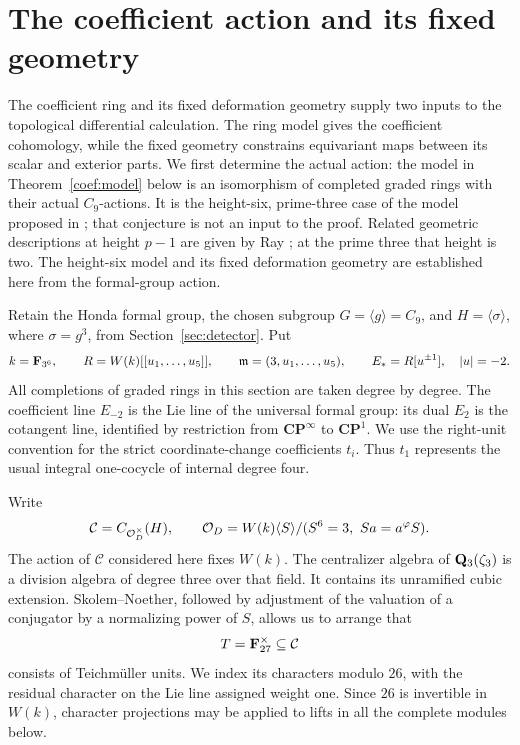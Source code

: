 \section{The coefficient action and its fixed geometry}
\label{sec:coefficients}

The coefficient ring and its fixed deformation geometry supply two
inputs to the topological differential calculation.  The ring model
gives the coefficient cohomology, while the fixed geometry constrains
equivariant maps between its scalar and exterior parts.
We first determine the actual action: the model in
Theorem~\ref{coef:model} below is an isomorphism of completed graded rings
with their actual \(C_9\)-actions.  It is the height-six, prime-three case
of the model proposed in \cite[Conjecture~0.3]{BR}; that conjecture is not
an input to the proof.
Related geometric descriptions at height \(p-1\) are given by
Ray \cite[Theorem~C and Section~10.5]{Ray}; at the prime three
that height is two.  The height-six model and its fixed deformation
geometry are established here from the formal-group action.

Retain the Honda formal group, the chosen subgroup
\(G=\langle g\rangle=C_9\), and \(H=\langle\sigma\rangle\), where
\(\sigma=g^3\), from Section~\ref{sec:detector}.  Put
\[
 k=\mathbf F_{3^6},\qquad
 R=W(k)[[u_1,\ldots,u_5]],\qquad
 \mathfrak m=(3,u_1,\ldots,u_5),\qquad E_*=R[u^{\pm1}],
 \quad |u|=-2.
\]
All completions of graded rings in this section are taken degree by
degree.  The coefficient line \(E_{-2}\) is the Lie line of the universal
formal group: its dual \(E_2\) is the cotangent line, identified by
restriction from \(\mathbf{CP}^{\infty}\) to \(\mathbf{CP}^1\).
We use the right-unit convention for the strict coordinate-change
coefficients \(t_i\).  Thus \(t_1\) represents the usual integral
one-cocycle of internal degree four.

Write
\[
 \mathcal C=C_{\mathcal O_D^\times}(H),\qquad
 \mathcal O_D=W(k)\langle S\rangle/(S^6=3,\ Sa=a^\varphi S).
\]
The action of \(\mathcal C\) considered here fixes \(W(k)\).  The
centralizer algebra of \(\mathbf Q_3(\zeta_3)\) is a division algebra of degree
three over that field.  It contains its unramified cubic extension.
Skolem--Noether, followed by adjustment of the valuation of a conjugator
by a normalizing power of \(S\), allows us to arrange that
\[
 T=\mathbf F_{27}^{\times}\subseteq\mathcal C
\]
consists of Teichm\"uller units.  We index its characters modulo \(26\),
with the residual character on the Lie line assigned weight one.
Since \(26\) is invertible in \(W(k)\), character projections may be
applied to lifts in all the complete modules below.

